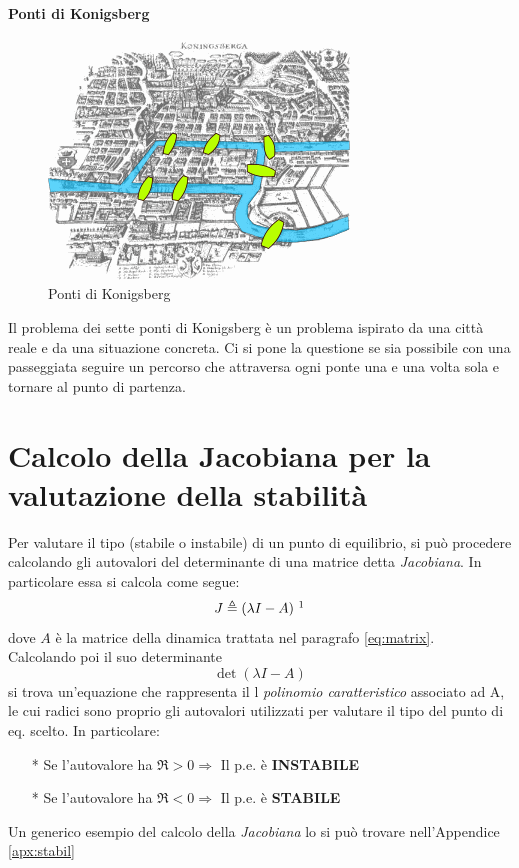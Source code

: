 \documentclass[a4paper]{report}
\begin{document}
\subsubsection{Ponti di Konigsberg}
\begin{figure}[!h]
  \begin{center}
    \includegraphics[scale=0.5]{./figures/konigsberg_bridges.png}
    \caption{Ponti di Konigsberg}\label{fig:konigsberg_bridges}
  \end{center}
\end{figure} 
Il problema dei sette ponti di Konigsberg \`e un problema ispirato da
una citt\`a reale e da una situazione concreta.
Ci si pone la questione se sia possibile con una passeggiata seguire
un percorso che attraversa ogni ponte una e una volta sola e tornare
al punto di partenza.
  
\appendix
\chapter {Calcolo della Jacobiana per la valutazione della stabilit\`a}\label{apx:jacob}
Per valutare il tipo (stabile o instabile) di un punto di equilibrio,
si pu\`o procedere calcolando gli autovalori del determinante di una
matrice detta \textsl{Jacobiana}. In particolare essa si calcola come
segue:
\begin{equation}\label{eq:jacobian}
  J\triangleq (\lambda I - A)~\footnote{$I$ \`e la matrice identit\`a}
\end{equation}
dove $A$ \`e la matrice della dinamica trattata nel paragrafo
\ref{eq:matrix}.\\
Calcolando poi il suo determinante
\begin{displaymath}
\det(\lambda I -A)
\end{displaymath}
si trova un'equazione che rappresenta il l \emph{polinomio
  caratteristico} associato ad A, le cui radici sono proprio gli
autovalori utilizzati per valutare il tipo del punto di eq. scelto. In
particolare: 
\begin{itemize}
\item[*] Se l'autovalore ha $\Re>0 \Longrightarrow$ Il p.e. \`e
  \textbf{INSTABILE} 
\item[*] Se l'autovalore ha $\Re<0 \Longrightarrow$ Il p.e. \`e
  \textbf{STABILE} 
\end{itemize}
Un generico esempio del calcolo della \emph{Jacobiana} lo si pu\`o
trovare nell'Appendice \ref{apx:stabil} 
\end{document}
